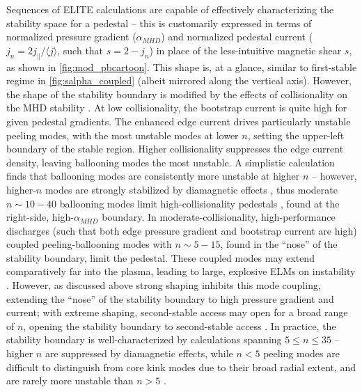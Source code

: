 Sequences of ELITE calculations are capable of effectively characterizing the stability space for a pedestal -- this is customarily expressed in terms of normalized pressure gradient ($\alpha_{MHD}$) and normalized pedestal current ($j_n = 2j_\parallel/\langle j \rangle$, such that $s = 2 - j_n$) in place of the less-intuitive magnetic shear $s$, as shown in \cref{fig:mod_pbcartoon}.  This shape is, at a glance, similar to first-stable regime in \cref{fig:salpha_coupled} (albeit mirrored along the vertical axis).  However, the shape of the stability boundary is modified by the effects of collisionality on the MHD stability \cite{Snyder2009}.  At low collisionality, the bootstrap current is quite high for given pedestal gradients.  The enhanced edge current drives particularly unstable peeling modes, with the most unstable modes at lower $n$, setting the upper-left boundary of the stable region.    Higher collisionality suppresses the edge current density, leaving ballooning modes the most unstable.  A simplistic calculation finds that ballooning modes are consistently more unstable at higher $n$ -- however, higher-$n$ modes are strongly stabilized by diamagnetic effects \cite{Suttrop2000}, thus moderate $n \sim 10-40$ ballooning modes limit high-collisionality pedestals \cite{Snyder2004}, found at the right-side, high-$\alpha_{MHD}$ boundary.  In moderate-collisionality, high-performance discharges (such that both edge pressure gradient and bootstrap current are high) coupled peeling-ballooning modes with $n \sim 5-15$, found in the ``nose'' of the stability boundary, limit the pedestal.  These coupled modes may extend comparatively far into the plasma, leading to large, explosive ELMs on instability \cite{Wilson2002}.  However, as discussed above strong shaping inhibits this mode coupling, extending the ``nose'' of the stability boundary to high pressure gradient and current; with extreme shaping, second-stable access may open for a broad range of $n$, opening the stability boundary to second-stable access \cite{Turnbull2003}.  In practice, the stability boundary is well-characterized by calculations spanning $5 \le n \le 35$ -- higher $n$ are suppressed by diamagnetic effects, while $n < 5$ peeling modes are difficult to distinguish from core kink modes due to their broad radial extent, and are rarely more unstable than $n > 5$ \cite{Snyder2009}.

